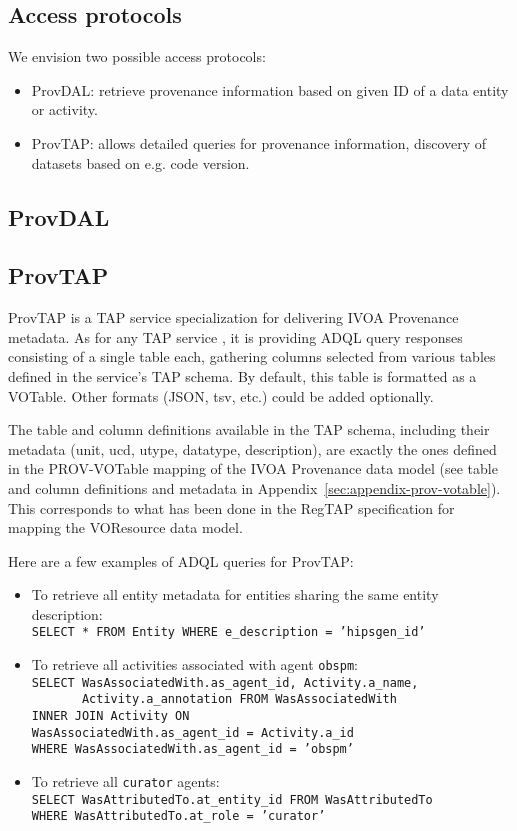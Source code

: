 \subsection{Access protocols}
\label{sec:access_protocols}
We envision two possible access protocols:
\begin{itemize}
\item ProvDAL: retrieve provenance information based on given ID of a data entity or activity.
\item ProvTAP: allows detailed queries for provenance information, discovery of datasets based on e.g. code version.
\end{itemize}

\subsection{ProvDAL}



\subsection{ProvTAP}
ProvTAP is a TAP service specialization for delivering IVOA Provenance metadata.
As for any TAP service \citep{std:TAP}, it is providing ADQL query responses
consisting of a single table each, gathering columns selected from various
tables defined in the service's TAP schema. By default, this table is formatted
as a VOTable. Other formats (JSON, tsv, etc.) could be added optionally.

The table and column definitions available in the TAP schema, including their
metadata (\attribute unit, \attribute ucd, \attribute utype, \attribute datatype, description), are exactly the ones defined
in the PROV-VOTable mapping of the IVOA Provenance data model (see table and
column definitions and metadata in Appendix~\ref{sec:appendix-prov-votable}).
This corresponds to what has been done in the RegTAP specification
\citep{std:RegTAP} for mapping the VOResource data model.

Here are a few examples of ADQL queries for ProvTAP:
\begin{itemize}
\item To retrieve all entity metadata for entities sharing the same entity description: \\
\texttt{SELECT * FROM  Entity WHERE e\_description = 'hipsgen\_id'}
\item To retrieve all activities associated with agent \texttt{obspm}: \\
\texttt{SELECT WasAssociatedWith.as\_agent\_id, Activity.a\_name, \\}
\verb!       !\texttt{Activity.a\_annotation FROM WasAssociatedWith \\
INNER JOIN Activity ON \\ WasAssociatedWith.as\_agent\_id = Activity.a\_id 
\\ WHERE  WasAssociatedWith.as\_agent\_id = 'obspm'}
\item To retrieve all \texttt{curator} agents: \\
\texttt{SELECT  WasAttributedTo.at\_entity\_id FROM WasAttributedTo \\
 WHERE WasAttributedTo.at\_role = 'curator'}
\end{itemize}

